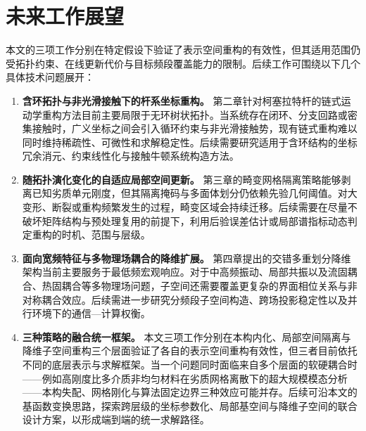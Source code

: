 \section{未来工作展望}
本文的三项工作分别在特定假设下验证了表示空间重构的有效性，但其适用范围仍受拓扑约束、在线更新代价与目标频段覆盖能力的限制。后续工作可围绕以下几个具体技术问题展开：

\begin{enumerate}
    \item \textbf{含环拓扑与非光滑接触下的杆系坐标重构。} 
    第二章针对柯塞拉特杆的链式运动学重构方法目前主要局限于无环树状拓扑。当系统存在闭环、分支回路或密集接触时，广义坐标之间会引入循环约束与非光滑接触势，现有链式重构难以同时维持稀疏性、可微性和求解稳定性。后续需要研究适用于含环结构的坐标冗余消元、约束线性化与接触牛顿系统构造方法。

    \item \textbf{随拓扑演化变化的自适应局部空间更新。} 
    第三章的畸变网格隔离策略能够剥离已知劣质单元刚度，但其隔离掩码与多面体划分仍依赖先验几何阈值。对大变形、断裂或重构频繁发生的过程，畸变区域会持续迁移。后续需要在尽量不破坏矩阵结构与预处理复用的前提下，利用后验误差估计或局部谱指标动态判定重构的时机、范围与层级。

    \item \textbf{面向宽频特征与多物理场耦合的降维扩展。} 
    第四章提出的交错多重划分降维架构当前主要服务于最低频宏观响应。对于中高频振动、局部共振以及流固耦合、热固耦合等多物理场问题，子空间还需要覆盖更复杂的界面相位关系与非对称耦合效应。后续需进一步研究分频段子空间构造、跨场投影稳定性以及并行环境下的通信—计算权衡。

    \item \textbf{三种策略的融合统一框架。}
    本文三项工作分别在本构内化、局部空间隔离与降维子空间重构三个层面验证了各自的表示空间重构有效性，但三者目前依托不同的底层表示与求解框架。当一个问题同时面临来自多个层面的软硬耦合时——例如高刚度比多介质非均匀材料在劣质网格离散下的超大规模模态分析——本构失配、网格刚化与算法固定边界三种效应可能并存。后续可沿本文的基函数变换思路，探索跨层级的坐标参数化、局部基空间与降维子空间的联合设计方案，以形成端到端的统一求解路径。

\end{enumerate}
